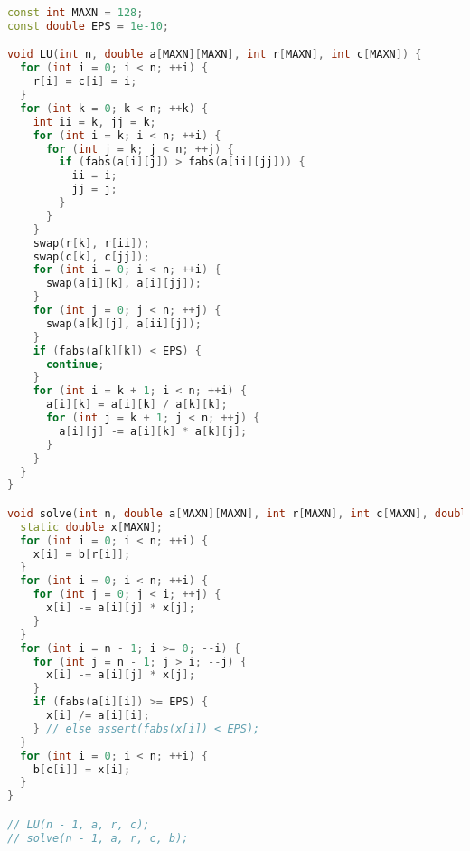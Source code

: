 \begin{lstlisting}[language=C++]
const int MAXN = 128;
const double EPS = 1e-10;

void LU(int n, double a[MAXN][MAXN], int r[MAXN], int c[MAXN]) {
  for (int i = 0; i < n; ++i) {
    r[i] = c[i] = i;
  }
  for (int k = 0; k < n; ++k) {
    int ii = k, jj = k;
    for (int i = k; i < n; ++i) {
      for (int j = k; j < n; ++j) {
        if (fabs(a[i][j]) > fabs(a[ii][jj])) {
          ii = i;
          jj = j;
        }
      }
    }
    swap(r[k], r[ii]);
    swap(c[k], c[jj]);
    for (int i = 0; i < n; ++i) {
      swap(a[i][k], a[i][jj]);
    }
    for (int j = 0; j < n; ++j) {
      swap(a[k][j], a[ii][j]);
    }
    if (fabs(a[k][k]) < EPS) {
      continue;
    }
    for (int i = k + 1; i < n; ++i) {
      a[i][k] = a[i][k] / a[k][k];
      for (int j = k + 1; j < n; ++j) {
        a[i][j] -= a[i][k] * a[k][j];
      }
    }
  }
}

void solve(int n, double a[MAXN][MAXN], int r[MAXN], int c[MAXN], double b[MAXN]) {
  static double x[MAXN];
  for (int i = 0; i < n; ++i) {
    x[i] = b[r[i]];
  }
  for (int i = 0; i < n; ++i) {
    for (int j = 0; j < i; ++j) {
      x[i] -= a[i][j] * x[j];
    }
  }
  for (int i = n - 1; i >= 0; --i) {
    for (int j = n - 1; j > i; --j) {
      x[i] -= a[i][j] * x[j];
    }
    if (fabs(a[i][i]) >= EPS) {
      x[i] /= a[i][i];
    } // else assert(fabs(x[i]) < EPS);
  }
  for (int i = 0; i < n; ++i) {
    b[c[i]] = x[i];
  }
}

// LU(n - 1, a, r, c);
// solve(n - 1, a, r, c, b);

\end{lstlisting}
